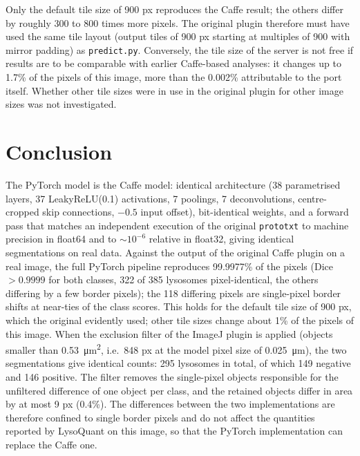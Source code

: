 \documentclass[11pt,a4paper]{article}
\begin{document}
Only the default tile size of 900 px reproduces the Caffe result; the others differ by roughly 300 to 800 times more pixels. The original plugin therefore must have used the same tile layout (output tiles of 900 px starting at multiples of 900 with mirror padding) as \texttt{predict.py}. Conversely, the tile size of the server is not free if results are to be comparable with earlier Caffe-based analyses: it changes up to 1.7\% of the pixels of this image, more than the 0.002\% attributable to the port itself. Whether other tile sizes were in use in the original plugin for other image sizes was not investigated.

\section{Conclusion}
The PyTorch model is the Caffe model: identical architecture (38 parametrised layers, 37 LeakyReLU(0.1) activations, 7 poolings, 7 deconvolutions, centre-cropped skip connections, $-0.5$ input offset), bit-identical weights, and a forward pass that matches an independent execution of the original \texttt{prototxt} to machine precision in float64 and to $\sim10^{-6}$ relative in float32, giving identical segmentations on real data. Against the output of the original Caffe plugin on a real image, the full PyTorch pipeline reproduces 99.9977\% of the pixels (Dice $>0.9999$ for both classes, 322 of 385 lysosomes pixel-identical, the others differing by a few border pixels); the 118 differing pixels are single-pixel border shifts at near-ties of the class scores. This holds for the default tile size of 900 px, which the original evidently used; other tile sizes change about 1\% of the pixels of this image. When the exclusion filter of the ImageJ plugin is applied (objects smaller than \SI{0.53}{\micro m\squared}, i.e.\ 848 px at the model pixel size of \SI{0.025}{\micro m}), the two segmentations give identical counts: 295 lysosomes in total, of which 149 negative and 146 positive. The filter removes the single-pixel objects responsible for the unfiltered difference of one object per class, and the retained objects differ in area by at most 9 px (0.4\%). The differences between the two implementations are therefore confined to single border pixels and do not affect the quantities reported by LysoQuant on this image, so that the PyTorch implementation can replace the Caffe one.
\end{document}
